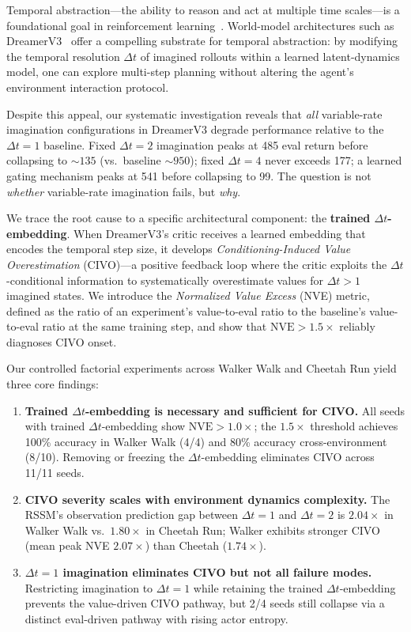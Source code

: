 \documentclass[10pt,letterpaper]{article}
\newcommand{\dt}{\Delta t}
\newcommand{\nve}{\mathrm{NVE}}
\begin{document}
Temporal abstraction---the ability to reason and act at multiple time scales---is a foundational goal in reinforcement learning~\citep{sutton1999options,precup2000temporal}.
World-model architectures such as DreamerV3~\citep{hafner2023dreamerv3} offer a compelling substrate for temporal abstraction: by modifying the temporal resolution $\dt$ of imagined rollouts within a learned latent-dynamics model, one can explore multi-step planning without altering the agent's environment interaction protocol.

Despite this appeal, our systematic investigation reveals that \emph{all} variable-rate imagination configurations in DreamerV3 degrade performance relative to the $\dt{=}1$ baseline.
Fixed $\dt{=}2$ imagination peaks at 485 eval return before collapsing to ${\sim}135$ (vs.\ baseline ${\sim}950$); fixed $\dt{=}4$ never exceeds 177; a learned gating mechanism peaks at 541 before collapsing to 99.
The question is not \emph{whether} variable-rate imagination fails, but \emph{why}.

We trace the root cause to a specific architectural component: the \textbf{trained $\dt$-embedding}.
When DreamerV3's critic receives a learned embedding that encodes the temporal step size, it develops \emph{Conditioning-Induced Value Overestimation} (CIVO)---a positive feedback loop where the critic exploits the $\dt$-conditional information to systematically overestimate values for $\dt{>}1$ imagined states.
We introduce the \emph{Normalized Value Excess} (NVE) metric, defined as the ratio of an experiment's value-to-eval ratio to the baseline's value-to-eval ratio at the same training step, and show that $\nve > 1.5\times$ reliably diagnoses CIVO onset.

Our controlled factorial experiments across Walker Walk and Cheetah Run yield three core findings:
\begin{enumerate}[nosep,leftmargin=*]
  \item \textbf{Trained $\dt$-embedding is necessary and sufficient for CIVO.} All seeds with trained $\dt$-embedding show $\nve > 1.0\times$; the $1.5\times$ threshold achieves 100\% accuracy in Walker Walk (4/4) and 80\% accuracy cross-environment (8/10). Removing or freezing the $\dt$-embedding eliminates CIVO across 11/11 seeds.
  \item \textbf{CIVO severity scales with environment dynamics complexity.} The RSSM's observation prediction gap between $\dt{=}1$ and $\dt{=}2$ is $2.04\times$ in Walker Walk vs.\ $1.80\times$ in Cheetah Run; Walker exhibits stronger CIVO (mean peak NVE $2.07\times$) than Cheetah ($1.74\times$).
  \item \textbf{$\dt{=}1$ imagination eliminates CIVO but not all failure modes.} Restricting imagination to $\dt{=}1$ while retaining the trained $\dt$-embedding prevents the value-driven CIVO pathway, but 2/4 seeds still collapse via a distinct eval-driven pathway with rising actor entropy.
\end{enumerate}
\end{document}
